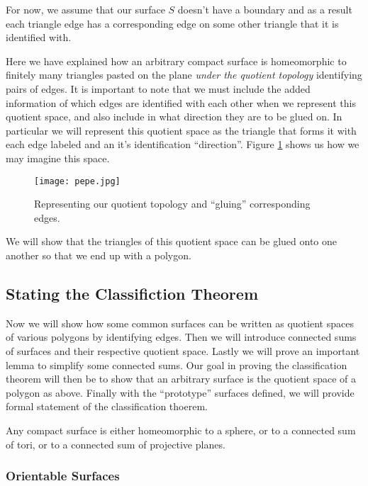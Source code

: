 For now, we assume that our surface $S$ doesn't have a
boundary and as a result each triangle edge has a corresponding edge %
on some other triangle that it is identified with.

Here we have explained how an arbitrary compact surface is
homeomorphic to finitely many triangles pasted on the plane
\emph{under the quotient topology} identifying pairs of edges. It is
important to note that we must include the added information of which
edges are identified with each other when we represent this quotient
space, and also include in what direction they are to be glued on. In
particular we will represent this quotient space as the triangle that
forms it with each edge labeled and an it's identification
``direction''. Figure \ref{fig:represent} shows us how we may imagine
this space.

\begin{figure}[h]
  \centering
  \texttt{[image: pepe.jpg]}
  \caption{Representing our quotient topology and ``gluing''
    corresponding edges.}
  \label{fig:represent}
\end{figure}

We will show that the triangles of this quotient space can be glued
onto one another so that we end up with a polygon.

\subsection{Stating the Classifiction Theorem}
\label{sec:surf:prototype}

Now we will show how some common surfaces can be written as quotient
spaces of various polygons by identifying edges. Then we will
introduce connected sums of surfaces and their respective quotient
space. Lastly we will prove an important lemma to simplify some
connected sums. Our goal in proving the classification theorem will
then be to show that an arbitrary surface is the quotient space of a
polygon as above. Finally with the ``prototype'' surfaces defined, we
will provide formal statement of the classification thoerem.

\begin{thm}
  Any compact surface is either homeomorphic to a sphere, or to a
  connected sum of tori, or to a connected sum of projective planes.
\end{thm}

\subsubsection{Orientable Surfaces}

